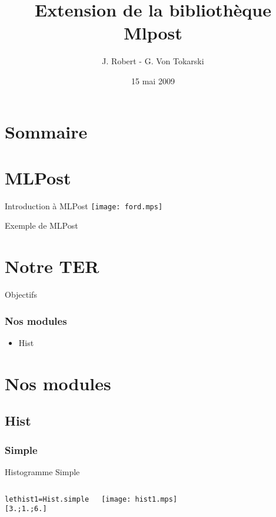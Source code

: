 \documentclass{beamer}
\title{Extension de la bibliothèque Mlpost}
\author{J. Robert - G. Von Tokarski}
\date{15 mai 2009}
\begin{document}
\begin{frame}
  \maketitle
\end{frame}

\section*{Sommaire}
\begin{frame}
  \tableofcontents
\end{frame}

\section{MLPost}
\begin{frame}{Introduction à MLPost}
  \texttt{[image: ford.mps]}
\end{frame}

\begin{frame}{Exemple de MLPost}
\end{frame}

\section{Notre TER}
\begin{frame}{Objectifs}
\end{frame}

\begin{frame}
  \frametitle{Nos modules}
  \begin{itemize}
    \item Hist
    
  \end{itemize}
\end{frame}

\section{Nos modules}
\subsection{Hist}
\subsubsection{Simple}


\begin{frame}{Histogramme Simple}
  \begin{columns}
    \begin{alltt}
      let hist1 = Hist.simple
      [3.;1.;6.]
    \end{alltt}
    \begin{center}
      \texttt{[image: hist1.mps]}
    \end{center}
  \end{columns}
    
\end{frame}
\end{document}
